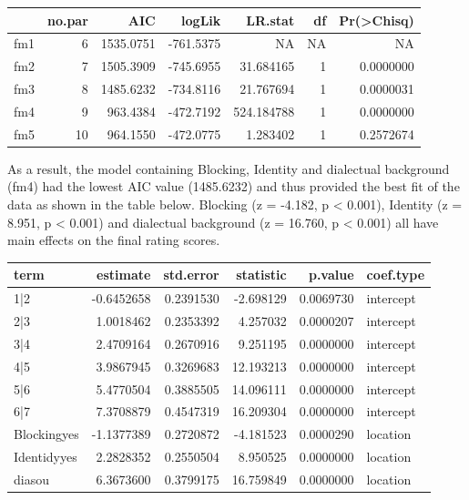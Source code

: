 \documentclass[
  english,
  man,floatsintext]{apa6}
\begin{document}
\begin{tabular}{l|r|r|r|r|r|r}
\hline
  & no.par & AIC & logLik & LR.stat & df & Pr(>Chisq)\\
\hline
fm1 & 6 & 1535.0751 & -761.5375 & NA & NA & NA\\
\hline
fm2 & 7 & 1505.3909 & -745.6955 & 31.684165 & 1 & 0.0000000\\
\hline
fm3 & 8 & 1485.6232 & -734.8116 & 21.767694 & 1 & 0.0000031\\
\hline
fm4 & 9 & 963.4384 & -472.7192 & 524.184788 & 1 & 0.0000000\\
\hline
fm5 & 10 & 964.1550 & -472.0775 & 1.283402 & 1 & 0.2572674\\
\hline
\end{tabular}

As a result, the model containing Blocking, Identity and dialectual background (fm4) had the lowest AIC value (1485.6232) and thus provided the best fit of the data as shown in the table below. Blocking (z = -4.182, p \textless{} 0.001), Identity (z = 8.951, p \textless{} 0.001) and dialectual background (z = 16.760, p \textless{} 0.001) all have main effects on the final rating scores.

\begin{tabular}{l|r|r|r|r|l}
\hline
term & estimate & std.error & statistic & p.value & coef.type\\
\hline
1|2 & -0.6452658 & 0.2391530 & -2.698129 & 0.0069730 & intercept\\
\hline
2|3 & 1.0018462 & 0.2353392 & 4.257032 & 0.0000207 & intercept\\
\hline
3|4 & 2.4709164 & 0.2670916 & 9.251195 & 0.0000000 & intercept\\
\hline
4|5 & 3.9867945 & 0.3269683 & 12.193213 & 0.0000000 & intercept\\
\hline
5|6 & 5.4770504 & 0.3885505 & 14.096111 & 0.0000000 & intercept\\
\hline
6|7 & 7.3708879 & 0.4547319 & 16.209304 & 0.0000000 & intercept\\
\hline
Blockingyes & -1.1377389 & 0.2720872 & -4.181523 & 0.0000290 & location\\
\hline
Identidyyes & 2.2828352 & 0.2550504 & 8.950525 & 0.0000000 & location\\
\hline
diasou & 6.3673600 & 0.3799175 & 16.759849 & 0.0000000 & location\\
\hline
\end{tabular}

\newpage
\end{document}

